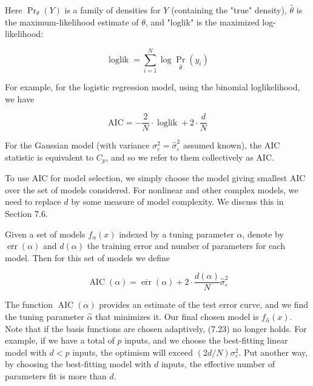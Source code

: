 \documentclass[10pt]{article}
\begin{document}
Here $\operatorname{Pr}_{\theta}(Y)$ is a family of densities for $Y$ (containing the "true" density), $\hat{\theta}$ is the maximum-likelihood estimate of $\theta$, and "loglik" is the maximized log-likelihood:


\begin{equation*}
\operatorname{loglik}=\sum_{i=1}^{N} \log \operatorname{Pr}_{\hat{\theta}}\left(y_{i}\right) \tag{7.28}
\end{equation*}


For example, for the logistic regression model, using the binomial loglikelihood, we have


\begin{equation*}
\mathrm{AIC}=-\frac{2}{N} \cdot \operatorname{loglik}+2 \cdot \frac{d}{N} \tag{7.29}
\end{equation*}


For the Gaussian model (with variance $\sigma_{\varepsilon}^{2}=\hat{\sigma}_{\varepsilon}^{2}$ assumed known), the AIC statistic is equivalent to $C_{p}$, and so we refer to them collectively as AIC.

To use AIC for model selection, we simply choose the model giving smallest AIC over the set of models considered. For nonlinear and other complex models, we need to replace $d$ by some measure of model complexity. We discuss this in Section 7.6.

Given a set of models $f_{\alpha}(x)$ indexed by a tuning parameter $\alpha$, denote by $\overline{\operatorname{err}}(\alpha)$ and $d(\alpha)$ the training error and number of parameters for each model. Then for this set of models we define


\begin{equation*}
\operatorname{AIC}(\alpha)=\overline{\operatorname{err}}(\alpha)+2 \cdot \frac{d(\alpha)}{N} \hat{\sigma}_{\varepsilon}^{2} \tag{7.30}
\end{equation*}


The function $\operatorname{AIC}(\alpha)$ provides an estimate of the test error curve, and we find the tuning parameter $\hat{\alpha}$ that minimizes it. Our final chosen model is $f_{\hat{\alpha}}(x)$. Note that if the basis functions are chosen adaptively, (7.23) no longer holds. For example, if we have a total of $p$ inputs, and we choose the best-fitting linear model with $d<p$ inputs, the optimism will exceed $(2 d / N) \sigma_{\varepsilon}^{2}$. Put another way, by choosing the best-fitting model with $d$ inputs, the effective number of parameters fit is more than $d$.
\end{document}

